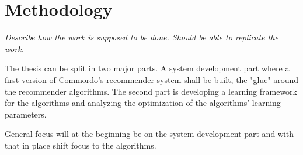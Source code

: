 \chapter{Methodology}\label{cha:method}

\textit{Describe how the work is supposed to be done. Should be able to replicate the work.}



The thesis can be split in two major parts. A system development part where a first version of Commordo's recommender system shall be built, the "glue" around the recommender algorithms. The second part is developing a learning framework for the algorithms and analyzing the optimization of the algorithms' learning parameters.

General focus will at the beginning be on the system development part and with that in place shift focus to the algorithms.





